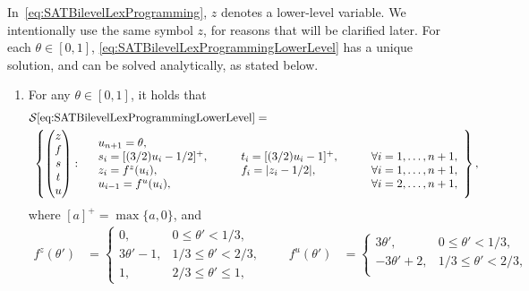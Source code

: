 \documentclass[runningheads,orivec]{llncs}
\newcommand{\MacroColor}[1]{#1}
\newcommand{\NVariables}{\MacroColor{n}}
\newcommand{\OptSolSet}{\MacroColor{\mathcal{S}}}
\newcommand{\ReformZ}{\MacroColor{z}}
\newcommand{\ReformAugFrac}{\MacroColor{f}}
\newcommand{\LexUVar}{\MacroColor{\theta}}
\newcommand{\LexLVarS}{\MacroColor{s}}
\newcommand{\LexLVarT}{\MacroColor{t}}
\newcommand{\LexLVarU}{\MacroColor{u}}
\newcommand{\LexLVarFuncU}{\MacroColor{f^u}}
\newcommand{\LexLVarFuncZ}{\MacroColor{f^z}}
\newcommand{\LexLVarFuncInput}{\MacroColor{\theta}}
\begin{document}
In~\eqref{eq:SATBilevelLexProgramming}, $\ReformZ$ denotes a lower-level variable. We intentionally use the same symbol $\ReformZ$, for reasons that will be clarified later.
For each $\theta \in [0, 1]$, \eqref{eq:SATBilevelLexProgrammingLowerLevel} has a unique solution, and can be solved analytically, as stated below.
\begin{lemma}
\label{lemma:LexLowerLevelSolution}
\mbox{}
\begin{enumerate}
\item 
\label{lemma:LexLowerLevelSolutionAssertionOne}
For any $\LexUVar \in [0, 1]$, it holds that
\begin{align*}
&
\OptSolSet\eqref{eq:SATBilevelLexProgrammingLowerLevel} =
\\
&
\
\left\{
\begin{pmatrix}
\ReformZ \\ \ReformAugFrac \\ \LexLVarS \\ \LexLVarT \\ \LexLVarU
\end{pmatrix}
:
\begin{array}{llllll}
&
\LexLVarU_{\NVariables + 1} = \theta,
\notag
\\
&
\LexLVarS_i = [(3/2) \LexLVarU_i - 1/2]^+, 
\quad
&&
\LexLVarT_i = [(3/2) \LexLVarU_i - 1]^+,
\quad
&&
\forall i = 1, \ldots, \NVariables + 1,
\\
&
z_i = \LexLVarFuncZ(\LexLVarU_{i}),
&&
\ReformAugFrac_i = |z_i - 1/2|,
&&
\forall i = 1, \ldots, \NVariables + 1,
\\
&
\LexLVarU_{i - 1} = \LexLVarFuncU(\LexLVarU_i),
&&
&&
\forall i = 2, \ldots, \NVariables + 1, \notag 
\notag 
\end{array}
\right\},
\end{align*}
where $[ a ]^+ = \max\{a, 0\}$, and
\begin{align*}
\LexLVarFuncZ(\LexLVarFuncInput{}') &= 
\begin{cases}
0, & 0 \le \LexLVarFuncInput{}' < 1/3, \\
3 \LexLVarFuncInput{}' - 1, & 1/3 \le \LexLVarFuncInput{}' < 2/3, \\
1, & 2/3 \le \LexLVarFuncInput{}' \le 1,
\end{cases}
\qquad
\LexLVarFuncU(\LexLVarFuncInput{}') &= 
\begin{cases}
3 \LexLVarFuncInput{}', & 0 \le \LexLVarFuncInput{}' < 1/3, \\
-3 \LexLVarFuncInput{}' + 2, & 1/3 \le \LexLVarFuncInput{}' < 2/3, \\

\end{cases}
\end{align*}
\end{enumerate}
\end{lemma}
\end{document}
